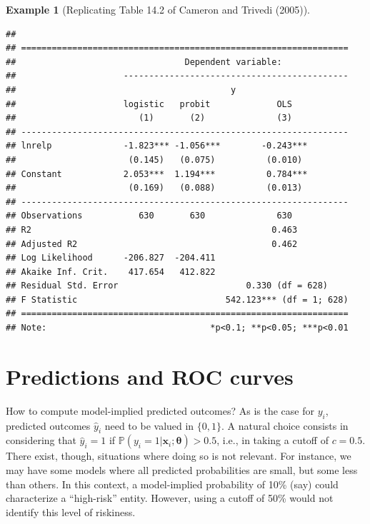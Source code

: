 \documentclass[
  12pt,
]{book}
\theoremstyle{definition}
\theoremstyle{definition}
\newtheorem{example}{Example}[chapter]
\theoremstyle{definition}
\theoremstyle{definition}
\theoremstyle{remark}
\begin{document}
\begin{example}[Replicating Table 14.2 of Cameron and Trivedi (2005)]
\begin{verbatim}
## 
## ================================================================
##                                 Dependent variable:             
##                     --------------------------------------------
##                                          y                      
##                     logistic   probit             OLS           
##                        (1)       (2)              (3)           
## ----------------------------------------------------------------
## lnrelp              -1.823*** -1.056***        -0.243***        
##                      (0.145)   (0.075)          (0.010)         
## Constant            2.053***  1.194***          0.784***        
##                      (0.169)   (0.088)          (0.013)         
## ----------------------------------------------------------------
## Observations           630       630              630           
## R2                                               0.463          
## Adjusted R2                                      0.462          
## Log Likelihood      -206.827  -204.411                          
## Akaike Inf. Crit.    417.654   412.822                          
## Residual Std. Error                         0.330 (df = 628)    
## F Statistic                             542.123*** (df = 1; 628)
## ================================================================
## Note:                                *p<0.1; **p<0.05; ***p<0.01
\end{verbatim}

\end{example}

\hypertarget{predictions-and-roc-curves}{%
\section{Predictions and ROC curves}\label{predictions-and-roc-curves}}

How to compute model-implied predicted outcomes? As is the case for \(y_i\), predicted outcomes \(\hat{y}_i\) need to be valued in \(\{0,1\}\). A natural choice consists in considering that \(\hat{y}_i=1\) if \(\mathbb{P}(y_i=1|\mathbf{x}_i;\boldsymbol\theta) > 0.5\), i.e., in taking a cutoff of \(c=0.5\). There exist, though, situations where doing so is not relevant. For instance, we may have some models where all predicted probabilities are small, but some less than others. In this context, a model-implied probability of 10\% (say) could characterize a ``high-risk'' entity. However, using a cutoff of 50\% would not identify this level of riskiness.
\end{document}

